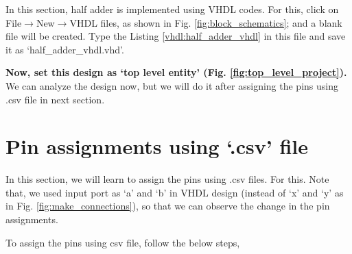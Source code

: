 In this section, half adder is implemented using VHDL codes. For this, click on File$\rightarrow$New$\rightarrow$VHDL files, as shown in Fig. \ref{fig:block_schematics}; and a blank file will be created. Type the Listing \ref{vhdl:half_adder_vhdl} in this file and save it as `half\_adder\_vhdl.vhd'. 

\textbf{Now, set this design as `top level entity' (Fig. \ref{fig:top_level_project}).} We can analyze the design now, but we will do it after assigning the pins using .csv file in next section.



\section{Pin assignments using `.csv' file}
In this section, we will learn to assign the pins using .csv files. For this. Note that, we used input port as `a' and `b' in VHDL design (instead of `x' and `y' as in Fig. \ref{fig:make_connections}), so that we can observe the change in the pin assignments. 

To assign the pins using csv file, follow the below steps, 

